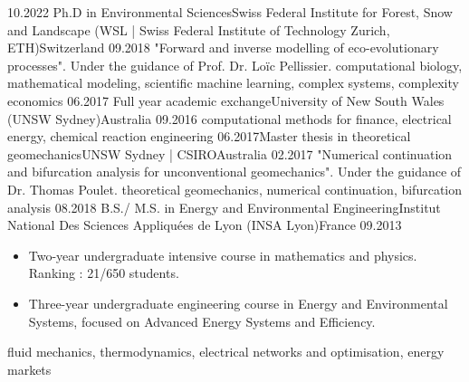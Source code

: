 \begin{experiences}
    \experience
      {10.2022}   {Ph.D in Environmental Sciences}{Swiss Federal Institute for Forest, Snow and Landscape (WSL | Swiss Federal Institute of Technology Zurich, ETH)}{Switzerland}
      {09.2018} {"Forward and inverse modelling of eco-evolutionary processes".
                      Under the guidance of Prof. Dr. Loïc Pellissier.
                      }
                      {computational biology, mathematical modeling, scientific machine learning, complex systems, complexity economics}
    \emptySeparator
    \experience
      {06.2017} {Full year academic exchange}{University of New South Wales (UNSW Sydney)}{Australia}
      {09.2016} {}{computational methods for finance, electrical energy, chemical reaction engineering}
    \emptySeparator
    \experience
      {06.2017}{Master thesis in theoretical geomechanics}{UNSW Sydney | CSIRO}{Australia}
      {02.2017}    {"Numerical continuation and bifurcation analysis for unconventional geomechanics". Under the guidance of Dr. Thomas Poulet.
                      }
                      {theoretical geomechanics, numerical continuation, bifurcation analysis}
    \emptySeparator
    \experience
    {08.2018}       {B.S./ M.S. in Energy and Environmental Engineering}{Institut National Des Sciences Appliquées de Lyon (INSA Lyon)}{France}
    {09.2013} {
    \begin{itemize}
        \item Two-year undergraduate intensive course in mathematics and physics.
  Ranking : 21/650 students.
        \item Three-year undergraduate engineering course in Energy and Environmental Systems, focused on Advanced Energy Systems and Efficiency.
    \end{itemize}
    }{fluid mechanics, thermodynamics, electrical networks and optimisation, energy markets}
  \end{experiences}

